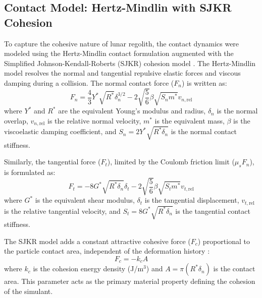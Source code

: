 \documentclass[preprint,12pt,authoryear]{elsarticle}
\begin{document}
\subsection{Contact Model: Hertz-Mindlin with SJKR Cohesion}
To capture the cohesive nature of lunar regolith, the contact dynamics were modeled using the Hertz-Mindlin contact formulation \citep{DiRenzo2004, Mindlin1949} augmented with the Simplified Johnson-Kendall-Roberts (SJKR) cohesion model \citep{Johnson1971}. The Hertz-Mindlin model resolves the normal and tangential repulsive elastic forces and viscous damping during a collision. The normal contact force ($F_n$) is written as:
\begin{equation}
F_n = \frac{4}{3} Y^* \sqrt{R^*} \delta_n^{3/2} - 2 \sqrt{\frac{5}{6}} \beta \sqrt{S_n m^*} v_{n,\mathrm{rel}}
\end{equation}
where $Y^*$ and $R^*$ are the equivalent Young's modulus and radius, $\delta_n$ is the normal overlap, $v_{n,\mathrm{rel}}$ is the relative normal velocity, $m^*$ is the equivalent mass, $\beta$ is the viscoelastic damping coefficient, and $S_n = 2 Y^* \sqrt{R^* \delta_n}$ is the normal contact stiffness.

Similarly, the tangential force ($F_t$), limited by the Coulomb friction limit ($\mu_s F_n$), is formulated as:
\begin{equation}
F_t = -8 G^* \sqrt{R^* \delta_n} \delta_t - 2 \sqrt{\frac{5}{6}} \beta \sqrt{S_t m^*} v_{t,\mathrm{rel}}
\end{equation}
where $G^*$ is the equivalent shear modulus, $\delta_t$ is the tangential displacement, $v_{t,\mathrm{rel}}$ is the relative tangential velocity, and $S_t = 8 G^* \sqrt{R^* \delta_n}$ is the tangential contact stiffness.

The SJKR model adds a constant attractive cohesive force ($F_c$) proportional to the particle contact area, independent of the deformation history \citep{Roessler2018}:
\begin{equation}
F_{c} = -k_{c} A
\end{equation}
where $k_{c}$ is the cohesion energy density (J/m$^3$) and $A = \pi (R^* \delta_n)$ is the contact area. This parameter acts as the primary material property defining the cohesion of the simulant.
\end{document}

